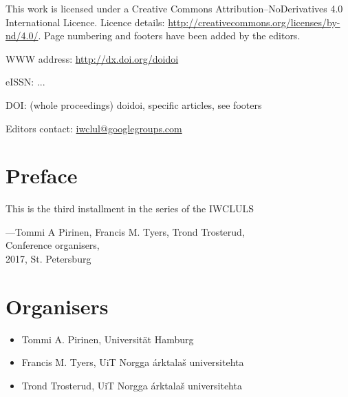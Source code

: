 \documentclass[b5paper]{book}
\newcommand\thedoi{doidoi}
\begin{document}
\frontmatter

\cleardoublepage
\thispagestyle{empty}
{\centering{}}

This work is licensed under a Creative Commons Attribution–NoDerivatives
4.0 International Licence.  Licence details:
\url{http://creativecommons.org/licenses/by-nd/4.0/}. Page numbering and
footers have been added by the editors.

WWW address: \url{http://dx.doi.org/\thedoi}

eISSN: ...

DOI: (whole proceedings) \thedoi, specific articles, see footers

Editors contact: \url{iwclul@googlegroups.com}

\clearpage

\renewcommand\thedoi{doidoi}

\pagestyle{fancy}

\chapter*{Preface}

This is the third installment in the series of the
IWCLULS

\noindent ---Tommi A Pirinen, Francis M. Tyers, Trond Trosterud,\\
Conference organisers,\\
2017, St. Petersburg

\renewcommand\thedoi{doidoi}

\chapter*{Organisers}

\begin{itemize}
    \item Tommi A. Pirinen, Universität Hamburg
    \item Francis M. Tyers, UiT Norgga árktalaš universitehta
    \item Trond Trosterud, UiT Norgga árktalaš universitehta
\end{itemize}
\end{document}
